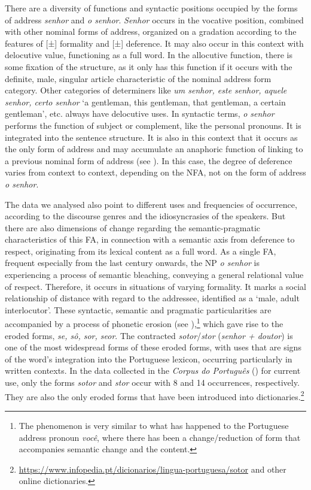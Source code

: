 \documentclass[output=paper]{langscibook}
\begin{document}
There are a diversity of functions and syntactic positions occupied by the forms of address \textit{senhor} and \textit{o senhor}. \textit{Senhor} occurs in the vocative position, combined with other nominal forms of address, organized on a gradation according to the features of [±] formality and [±] deference. It may also occur in this context with delocutive value, functioning as a full word. In the allocutive function, there is some fixation of the structure, as it only has this function if it occurs with the definite, male, singular article characteristic of the nominal address form category. Other categories of determiners like \textit{um senhor, este senhor, aquele senhor, certo senhor} ‘a gentleman, this gentleman, that gentleman, a certain gentleman’, etc. always have delocutive uses. In syntactic terms, \textit{o senhor} performs the function of subject or complement, like the personal pronouns. It is integrated into the sentence structure. It is also in this context that it occurs as the only form of address and may accumulate an anaphoric function of linking to a previous nominal form of address (see ). In this case, the degree of deference varies from context to context, depending on the NFA, not on the form of address \textit{o senhor}. 



The data we analysed also point to different uses and frequencies of occurrence, according to the discourse genres and the idiosyncrasies of the speakers. But there are also dimensions of change regarding the semantic-pragmatic characteristics of this FA, in connection with a semantic axis from deference to respect, originating from its lexical content as a full word. As a single FA, frequent especially from the last century onwards, the NP \textit{o senhor} is experiencing a process of semantic bleaching, conveying a general relational value of respect. Therefore, it occurs in situations of varying formality. It marks a social relationship of distance with regard to the addressee, identified as a `male, adult interlocutor'. These syntactic, semantic and pragmatic particularities are accompanied by a process of phonetic erosion (see \citealt[3]{HeineKuteva2004}),\footnote{The phenomenon is very similar to what has happened to the Portuguese address pronoun \textit{você}, where there has been a change/reduction of form that accompanies semantic change and the content.}  which gave rise to the eroded forms, \textit{se, sô, sor, seor}. The contracted \textit{sotor}\slash\textit{stor} (\textit{senhor + doutor}) is one of the most widespread forms of these eroded forms, with uses that are signs of the word's integration into the Portuguese lexicon, occurring particularly in written contexts. In the data collected in the \textit{Corpus do Português} (\citealt{DaviesFerreira2016}) for current use, only the forms \textit{sotor} and \textit{stor} occur with 8 and 14 occurrences, respectively. They are also the only eroded forms that have been introduced into dictionaries.\footnote{\url{https://www.infopedia.pt/dicionarios/lingua-portuguesa/sotor} and other online dictionaries.}
\end{document}
